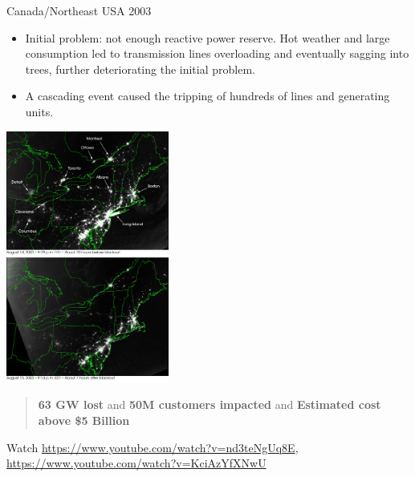 \begin{frame}[allowframebreaks]{Canada/Northeast USA 2003}
\begin{itemize}
    \item Initial problem: not enough reactive power reserve. Hot weather and large consumption led to transmission lines overloading and eventually sagging into trees, further deteriorating the initial problem.
    \item A cascading event caused the tripping of hundreds of lines and generating units.
\end{itemize}
\vspace{0.5cm}
\begin{center}
\includegraphics[width=0.4\textwidth]{images/USABlackOut.png}
\end{center}
\vspace{0.5cm}
\begin{quote}
    \textbf{63 GW lost} and \textbf{50M customers impacted} and \textbf{Estimated cost above \$5 Billion}
\end{quote}

Watch \url{https://www.youtube.com/watch?v=nd3teNgUq8E}, \url{https://www.youtube.com/watch?v=KciAzYfXNwU}
\end{frame}

